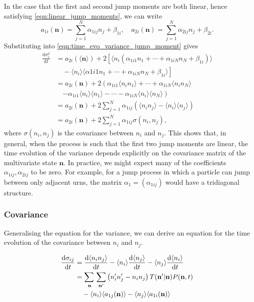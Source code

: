 \documentclass[a4paper,11pt]{article}
\numberwithin{equation}{section}
\newcommand{\diff}[2]{\frac{\mathrm{d} #1}{\mathrm{d} #2}}
\newcommand{\V}[1]{\mathbf{#1}}
\newcommand{\E}[1]{\langle #1 \rangle}
\begin{document}
In the case that the first and second jump moments are both linear, hence
satisfying \eqref{eqn:linear_jump_moments}, we can write
\begin{equation*}
    a_{1i}(\V{n}) = \sum_{j=1}^N \alpha_{1ij} n_j + \beta_{1i}, \quad
    a_{2i}(\V{n}) = \sum_{j=1}^N \alpha_{2ij} n_j + \beta_{2i}.
\end{equation*}
Substituting into \eqref{eqn:time_evo_variance_jump_moment} gives
\begin{equation}
    \begin{aligned}
        \diff{\sigma_i^2}{t} &= a_{2i}(\E{\V{n}}) + 2\left[ \E{n_i (\alpha_{1i1}n_1 +
            \dotsb + \alpha_{1iN}n_N + \beta_{1i})} \right.\\
            &\left. \quad - \E{n_i} \E{ \alpha{1i1}n_1 +
        \dotsb + \alpha_{1iN}n_N + \beta_{1i}} \right]\\
        &= a_{2i}(\V{n}) + 2\left( \alpha_{1i1}\E{n_i n_1} + \dotsb +
        \alpha_{1iN}\E{n_i n_N}\right.\\
        &\quad \left. - \alpha_{1i1}\E{n_i}\E{n_1} - \dotsb -
        \alpha_{1iN}\E{n_i}\E{n_N} \right)\\
        &= a_{2i}(\V{n}) + 2 \sum_{j=1}^N \alpha_{1ij}(\E{n_i n_j} -
        \E{n_i}\E{n_j})\\
        &= a_{2i}(\V{n}) + 2 \sum_{j=1}^N \alpha_{1ij}\sigma(n_i,n_j),
    \end{aligned}
\end{equation}
where \(\sigma(n_i, n_j)\) is the covariance between \(n_i\) and \(n_j\).
This shows that, in general, when the process is such that the first two jump
moments are linear, the time evolution of the variance depends explicitly on the
covariance matrix of the multivariate state \(\V{n}\). In practice, we might
expect many of the coefficients \(\alpha_{1ij}, \alpha_{2ij}\) to be zero. For
example, for a jump process in which a particle can jump between only adjacent
urns, the matrix \(\alpha_1 = (\alpha_{1ij})\) would have a tridiagonal
structure.

\subsubsection{Covariance}
Generalising the equation for the variance, we can derive an equation for the
time evolution of the covariance between \(n_i\) and \(n_j\).

\begin{equation}
    \begin{aligned}
        \diff{\sigma_{ij}}{t}
        &= \diff{\E{n_i n_j}}{t} - \E{n_i}\diff{\E{n_j}}{t}  -
        \E{n_j}\diff{\E{n_i}}{t}\\
        &= \adjustlimits\sum_{\V{n}} \sum_{\V{n}'}\left(n_i' n_j' - n_i
        n_j\right)T(\V{n}' | \V{n})P(\V{n},t)\\
        & \quad - \E{n_i}\E{a_{1j}(\V{n})} - \E{n_j}\E{a_{1i}(\V{n})}
    \end{aligned}
\end{equation}
\end{document}

